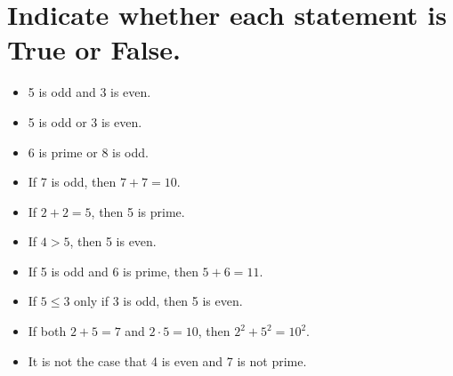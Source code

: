 \documentclass[11pt]{article} %
\begin{document}
\section{Indicate whether each statement is True or False.}
\begin{itemize}
	\item 5 is odd and 3 is even.
	\item 5 is odd or 3 is even.
	\item 6 is prime or 8 is odd.
	\item If 7 is odd, then $7+7=10$.
	\item If $2+2=5$, then 5 is prime.
	\item If $4>5$, then 5 is even.
	\item If 5 is odd and 6 is prime, then $5+6=11$.
	\item If $5\leq3$ only if 3 is odd, then 5 is even.
	\item If both $2+5=7$ and $2\cdot5=10$, then $2^2+5^2=10^2$.
	\item It is not the case that 4 is even and 7 is not prime.
\end{itemize}
\end{document}
